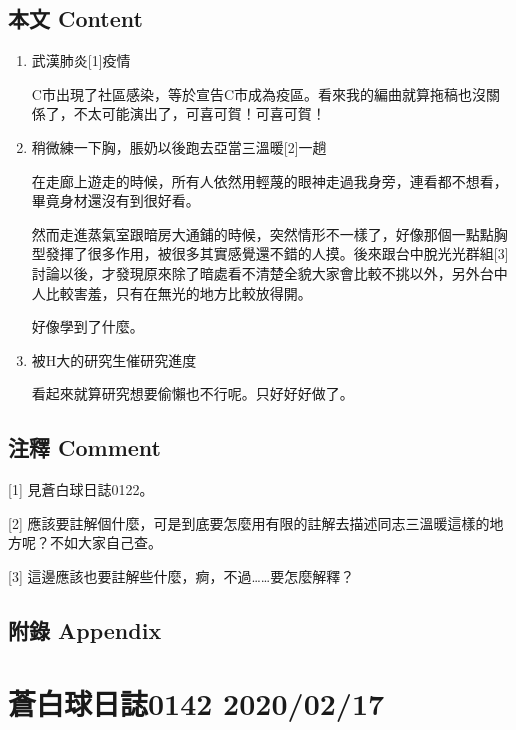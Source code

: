 \documentclass[a5paper, 12pt
]{book}
\begin{document}
\hypertarget{ux672cux6587-content-77}{%
\subsection{本文 Content}\label{ux672cux6587-content-77}}

\begin{enumerate}
\def\labelenumi{\arabic{enumi}.}
\item
  武漢肺炎{[}1{]}疫情

  C市出現了社區感染，等於宣告C市成為疫區。看來我的編曲就算拖稿也沒關係了，不太可能演出了，可喜可賀！可喜可賀！
\item
  稍微練一下胸，脹奶以後跑去亞當三溫暖{[}2{]}一趟

  在走廊上遊走的時候，所有人依然用輕蔑的眼神走過我身旁，連看都不想看，畢竟身材還沒有到很好看。

  然而走進蒸氣室跟暗房大通鋪的時候，突然情形不一樣了，好像那個一點點胸型發揮了很多作用，被很多其實感覺還不錯的人摸。後來跟台中脫光光群組{[}3{]}討論以後，才發現原來除了暗處看不清楚全貌大家會比較不挑以外，另外台中人比較害羞，只有在無光的地方比較放得開。

  好像學到了什麼。
\item
  被H大的研究生催研究進度

  看起來就算研究想要偷懶也不行呢。只好好好做了。
\end{enumerate}

\hypertarget{ux6ce8ux91cb-comment-76}{%
\subsection{注釋 Comment}\label{ux6ce8ux91cb-comment-76}}

{[}1{]} 見蒼白球日誌0122。

{[}2{]}
應該要註解個什麼，可是到底要怎麼用有限的註解去描述同志三溫暖這樣的地方呢？不如大家自己查。

{[}3{]} 這邊應該也要註解些什麼，痾，不過\ldots\ldots 要怎麼解釋？

\hypertarget{ux9644ux9304-appendix-77}{%
\subsection{附錄 Appendix}\label{ux9644ux9304-appendix-77}}

\hypertarget{ux84bcux767dux7403ux65e5ux8a8c0142-20200217}{%
\section{蒼白球日誌0142
2020/02/17}\label{ux84bcux767dux7403ux65e5ux8a8c0142-20200217}}
\end{document}
